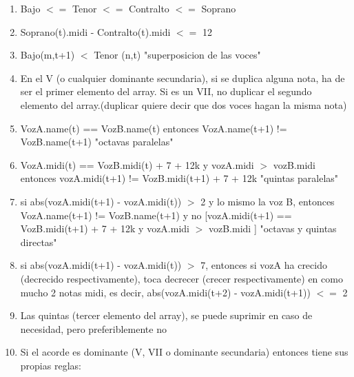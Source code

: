 \documentclass{article}
\begin{document}
	\begin{enumerate}
	
		\item Bajo $<=$ Tenor $<=$ Contralto $<=$ Soprano\\
	
		\item Soprano(t).midi - Contralto(t).midi $<=$ 12 \\	
		
		\item Bajo(m,t+1) $<$ Tenor (n,t)    "superposicion de las voces"\\
		
		\item En el V (o cualquier dominante secundaria), si se duplica alguna nota, ha de ser el primer elemento del array. Si es un VII, no duplicar el segundo elemento del array.(duplicar quiere decir que dos voces hagan la misma nota)
		
		\item VozA.name(t) == VozB.name(t) entonces VozA.name(t+1) != VozB.name(t+1)   "octavas paralelas"\\
		
		
		\item VozA.midi(t) == VozB.midi(t) + 7 + 12k      y    vozA.midi $>$ vozB.midi
	     entonces vozA.midi(t+1) != VozB.midi(t+1) + 7 + 12k    "quintas paralelas"\\
	     
	     
	    \item si abs(vozA.midi(t+1) - vozA.midi(t)) $>$ 2 y lo mismo la voz B, entonces VozA.name(t+1) != VozB.name(t+1) y no [vozA.midi(t+1) == VozB.midi(t+1) + 7 + 12k   y vozA.midi $>$ vozB.midi ]      "octavas y quintas directas"\\
	    
	    
	    \item si abs(vozA.midi(t+1) - vozA.midi(t)) $>$ 7, entonces si vozA ha crecido (decrecido respectivamente), toca decrecer (crecer respectivamente) en como mucho 2 notas midi, es decir, abs(vozA.midi(t+2) - vozA.midi(t+1)) $<=$ 2\\
	    
	    
	    \item Las quintas (tercer elemento del array), se puede suprimir en caso de necesidad, pero preferiblemente no\\
	    
	    
	    \item Si el acorde es dominante (V, VII o dominante secundaria) entonces tiene sus propias reglas:  \\
	    

\end{enumerate}
\end{document}
